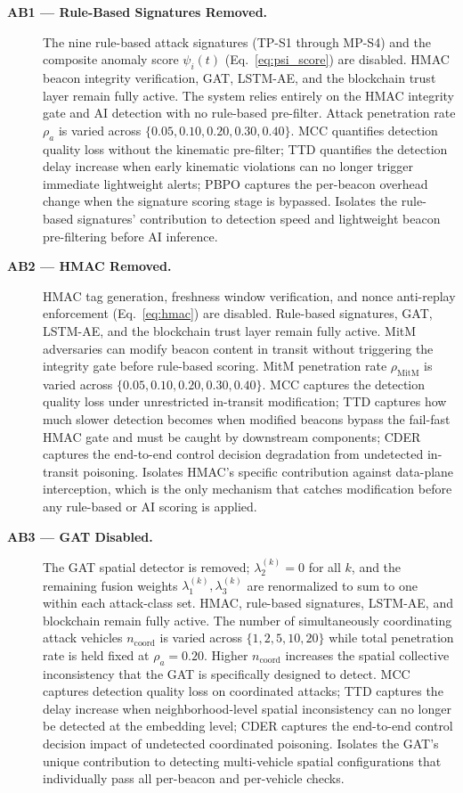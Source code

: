 \documentclass[12pt, a4paper]{report}
\begin{document}
\begin{description}

\item[\textbf{AB1 --- Rule-Based Signatures Removed.}]
The nine rule-based attack signatures (TP-S1 through MP-S4) and the
composite anomaly score $\psi_i(t)$ (Eq.~\ref{eq:psi_score}) are
disabled. HMAC beacon integrity verification, GAT, LSTM-AE, and the
blockchain trust layer remain fully active. The system relies
entirely on the HMAC integrity gate and AI detection with no
rule-based pre-filter. Attack penetration rate $\rho_a$ is varied
across $\{0.05, 0.10, 0.20, 0.30, 0.40\}$. MCC quantifies detection
quality loss without the kinematic pre-filter; TTD quantifies the
detection delay increase when early kinematic violations can no longer
trigger immediate lightweight alerts; PBPO captures the per-beacon
overhead change when the signature scoring stage is bypassed.
Isolates the rule-based signatures' contribution to detection speed
and lightweight beacon pre-filtering before AI inference.

\item[\textbf{AB2 --- HMAC Removed.}]
HMAC tag generation, freshness window verification, and nonce
anti-replay enforcement (Eq.~\ref{eq:hmac}) are disabled. Rule-based
signatures, GAT, LSTM-AE, and the blockchain trust layer remain
fully active. MitM adversaries can modify beacon content in transit
without triggering the integrity gate before rule-based scoring.
MitM penetration rate $\rho_{\mathrm{MitM}}$ is varied across
$\{0.05, 0.10, 0.20, 0.30, 0.40\}$. MCC captures the detection
quality loss under unrestricted in-transit modification; TTD captures
how much slower detection becomes when modified beacons bypass the
fail-fast HMAC gate and must be caught by downstream components;
CDER captures the end-to-end control decision degradation from
undetected in-transit poisoning. Isolates HMAC's specific
contribution against data-plane interception, which is the only
mechanism that catches modification before any rule-based or AI
scoring is applied.

\item[\textbf{AB3 --- GAT Disabled.}]
The GAT spatial detector is removed; $\lambda_2^{(k)} = 0$ for all
$k$, and the remaining fusion weights $\lambda_1^{(k)}, \lambda_3^{(k)}$
are renormalized to sum to one within each attack-class set. HMAC, rule-based signatures, LSTM-AE, and blockchain
remain fully active. The number of simultaneously coordinating
attack vehicles $n_{\mathrm{coord}}$ is varied across $\{1, 2, 5,
10, 20\}$ while total penetration rate is held fixed at
$\rho_a = 0.20$. Higher $n_{\mathrm{coord}}$ increases the spatial
collective inconsistency that the GAT is specifically designed to
detect. MCC captures detection quality loss on coordinated attacks;
TTD captures the delay increase when neighborhood-level spatial
inconsistency can no longer be detected at the embedding level;
CDER captures the end-to-end control decision impact of undetected
coordinated poisoning. Isolates the GAT's unique contribution to
detecting multi-vehicle spatial configurations that individually
pass all per-beacon and per-vehicle checks.


\end{description}
\end{document}
